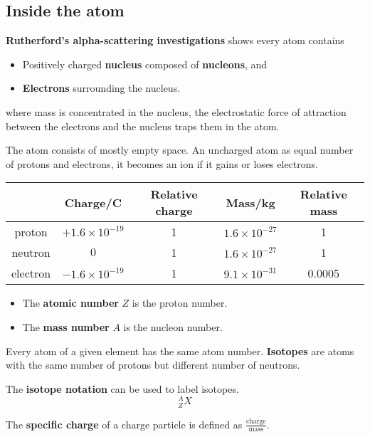\subsection{Inside the atom}

\textbf{Rutherford's alpha-scattering investigations} shows every atom contains
\begin{itemize}
    \item Positively charged \textbf{nucleus} composed of \textbf{nucleons}, and
    \item \textbf{Electrons} surrounding the nucleus.
\end{itemize}
where mass is concentrated in the nucleus, the electrostatic force of attraction between the electrons and the nucleus traps them in the atom.

The atom consists of mostly empty space. An uncharged atom as equal number of protons and electrons, it becomes an ion if it gains or loses electrons.

\begin{tabular}{|c|c|c|c|c|}
    \hline
    & Charge/C & Relative charge & Mass/kg & Relative mass\\
    \hline
    proton & $+1.6\times10^{-19}$ & 1 & $1.6\times10^{-27}$ & 1\\
    neutron & $0$ & 1 & $1.6\times10^{-27}$ & 1\\
    electron & $-1.6\times10^{-19}$ & 1 & $9.1\times10^{-31}$ & 0.0005\\
    \hline
\end{tabular}

\begin{itemize}
    \item The \textbf{atomic number} $Z$ is the proton number.
    \item The \textbf{mass number} $A$ is the nucleon number.
\end{itemize}

Every atom of a given element has the same atom number. \textbf{Isotopes} are atoms with the same number of protons but different number of neutrons.

The \textbf{isotope notation} can be used to label isotopes.
$$^A_ZX$$

The \textbf{specific charge} of a charge particle is defined as $\frac{\text{charge}}{\text{mass}}$.
